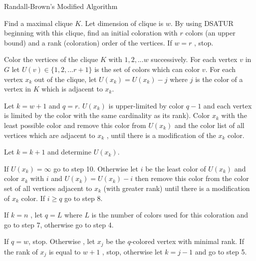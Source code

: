 \documentclass{beamer}
\begin{document}
\begin{frame}{Randall-Brown's Modified Algorithm}
\begin{enumerate}


 
{\tiny  \item Find a maximal clique $K$. Let dimension of clique is $w$. By using DSATUR
beginning with this clique, find an initial coloration with $r$ colors (an
upper bound) and a rank (coloration) order of the vertices. If $w = r$ , stop.\\

\item  Color the vertices of the clique $K$ with $1, 2, . . . w$ successively. For each
vertex $v$ in $G$ let $U(v) \in \{1, 2, . . . r + 1\}$ is the set of colors which can color
$v$. For each vertex $x_k$ out of the clique, let $U(x_k) = U(x_k) - j$ where $j$ is
the color of a vertex in $K$ which is adjacent to $x_k$.\\

\item  Let $k = w + 1$ and $q = r$.\newline
$U(x_k)$ is upper-limited by color $q - 1$ and each vertex is limited by the color
with the same cardinality as its rank). Color $x_k$ with the least possible
color and remove this color from $U(x_k)$ and the color list of all vertices
which are adjacent to $x_k$ , until there is a modification of the $x_k$ color.

\item Let $k = k + 1$ and determine $U(x_k)$.\\

\item  If $U(x_k) = \infty$ go to step 10. Otherwise let $i$ be the least color of $U(x_k)$ and
color $x_k$ with $i$ and $U(x_k) = U(x_k) - i$ then remove this color from the
color set of all vertices adjacent to $x_k$ (with greater rank) until there is a
modification of $x_k$ color. If $i \geq q$ go to step 8.\\

\item  If $k = n$ , let $q = L$ where $L$ is the number of colors used for this coloration
and go to step 7, otherwise go to step 4.\\

\item  If $q = w$, stop. Otherwise , let $x_j$ be the $q$-colored vertex with minimal
rank. If the rank of $x_j$ is equal to $w + 1$ , stop, otherwise let $k = j - 1$ and
go to step 5.\\

}
\end{enumerate}
\end{frame}
\end{document}
